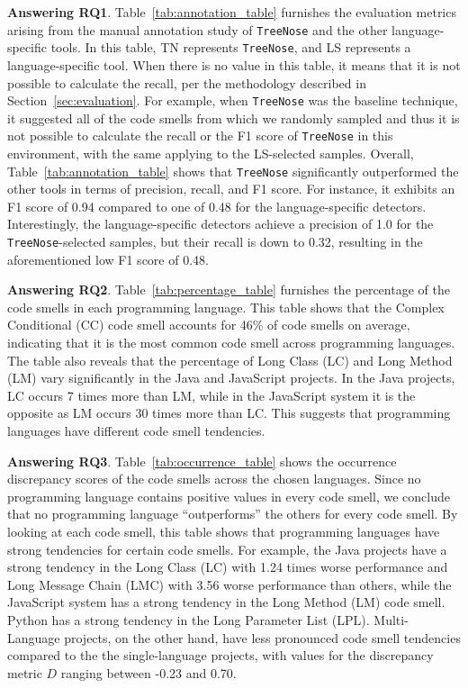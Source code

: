 


{\bf Answering RQ1}. Table~\ref{tab:annotation_table} furnishes the evaluation
metrics arising from the manual annotation study of \texttt{TreeNose} and the
other language-specific tools.
%
In this table, TN represents \texttt{TreeNose}, and LS represents a
language-specific tool.
%
When there is no value in this table, it means that it is not possible to
calculate the recall, per the methodology described in
Section~\ref{sec:evaluation}.
%
For example, when \texttt{TreeNose} was the baseline technique, it suggested
all of the code smells from which we randomly sampled and thus it is not
possible to calculate the recall or the F1 score of \texttt{TreeNose} in this
environment, with the same applying to the LS-selected samples.
%
Overall, Table~\ref{tab:annotation_table} shows that \texttt{TreeNose}
significantly outperformed the other tools in terms of precision, recall, and
F1 score.
%
For instance, it exhibits an F1 score of 0.94 compared to one of 0.48 for the
language-specific detectors.
%
Interestingly, the language-specific detectors achieve a precision of 1.0 for
the \texttt{TreeNose}-selected samples, but their recall is down to 0.32,
resulting in the aforementioned low F1 score of 0.48.


{\bf Answering RQ2}. Table~\ref{tab:percentage_table} furnishes the percentage
of the code smells in each programming language. This table shows that the
Complex Conditional (CC) code smell accounts for 46\% of code smells on
average, indicating that it is the most common code smell across programming
languages.
%
The table also reveals that the percentage of Long Class (LC) and Long Method
(LM) vary significantly in the Java and JavaScript projects. In the Java
projects, LC occurs 7 times more than LM, while in the JavaScript system it is
the opposite as LM occurs 30 times more than LC. This suggests that programming
languages have different code smell tendencies.

{\bf Answering RQ3}. Table~\ref{tab:occurrence_table} shows the occurrence
discrepancy scores of the code smells across the chosen languages. Since no
programming language contains positive values in every code smell, we conclude
that no programming language ``outperforms'' the others for every code smell.
By looking at each code smell, this table shows that programming languages have
strong tendencies for certain code smells.
%
For example, the Java projects have a strong tendency in the Long Class (LC)
with 1.24 times worse performance and Long Message Chain (LMC) with 3.56 worse
performance than others, while the JavaScript system has a strong tendency in
the Long Method (LM) code smell. Python has a strong tendency in the Long
Parameter List (LPL). Multi-Language projects, on the other hand, have less
pronounced code smell tendencies compared to the the single-language projects,
with values for the discrepancy metric $D$ ranging between -0.23 and 0.70.
